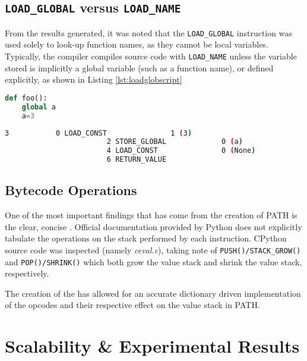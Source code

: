         \subsection{\lstinline|LOAD_GLOBAL| versus \lstinline|LOAD_NAME|}
        \par From the results generated, it was noted that the \lstinline|LOAD_GLOBAL| instruction was used solely to look-up function names, as they cannot be local variables. Typically, the compiler compiles source code with \lstinline|LOAD_NAME| unless the variable stored is implicitly a global variable (such as a function name), or defined explicitly, as shown in Listing \ref{lst:loadglobscript}
        
        \begin{lstlisting}[float,language=Python,caption= \lstinline|LOAD_GLOBAL| script,label=lst:loadglobscript]
def foo():
    global a
    a=3
        \end{lstlisting}

        \begin{lstlisting}[float,language=bash,caption= Bytecode Dissasmbly of Listing \ref{lst:loadglobscript},numbers=none]
            3           0 LOAD_CONST               1 (3)
                        2 STORE_GLOBAL             0 (a)
                        4 LOAD_CONST               0 (None)
                        6 RETURN_VALUE
        \end{lstlisting}
    
        \subsection{Bytecode Operations}
        \par One of the most important findings that has come from the creation of \acs{PATH} is the clear, concise . Official documentation provided by Python does not explicitly tabulate the operations on the stack performed by each instruction. CPython source code was inspected (namely \textit{ceval.c}), taking note of \lstinline|PUSH()/STACK_GROW()| and \lstinline|POP()/SHRINK()| which both grow the value stack and shrink the value stack, respectively.
        \par The creation of the  has allowed for an accurate dictionary driven implementation of the opcodes and their respective effect on the value stack in \acs{PATH}.
        
    \section{Scalability \& Experimental Results}
    \label{sec:scalex}
    

